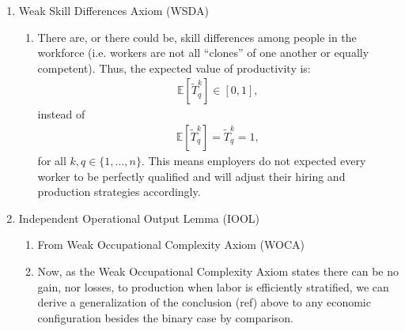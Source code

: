 \documentclass[hidelinks, nonatbib]{elsarticle}
\begin{document}
\begin{enumerate}
    \item Weak Skill Differences Axiom (WSDA)
    \begin{enumerate}
        \item There are, or there could be, skill differences among people in the workforce (i.e. workers are not all ``clones'' of one another or equally competent). Thus, the expected value of productivity is:
        \begin{gather}
            \mathbb{E}[
                \tilde{T}_{q}^{k}
            ]
            \in
            [0,1]
            ,
        \end{gather}
        instead of 
        \begin{gather}
            \mathbb{E}[
                \tilde{T}_{q}^{k}
            ]
            =
            \tilde{T}_{q}^{k}
            = 1
            ,
        \end{gather}
        for all $k,q \in \{1, \dots, n\}$. This means employers do not expected every worker to be perfectly qualified and will adjust their hiring and production strategies accordingly.
    \end{enumerate}
    \item Independent Operational Output Lemma (IOOL)
    \begin{enumerate}
        \item From Weak Occupational Complexity Axiom (WOCA)
        \item Now, as the Weak Occupational Complexity Axiom states there can be no gain, nor losses, to production when labor is efficiently stratified, we can derive a generalization of the conclusion (ref) above to any economic configuration besides the binary case by comparison. 
        

\end{enumerate}
\end{enumerate}
\end{document}
